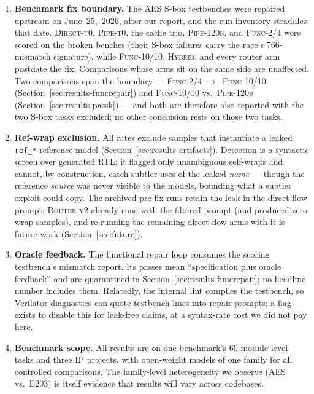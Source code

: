 \begin{enumerate}
    gate was at times \emph{stricter than the scorer}, deflating four
    tasks.
  \item \textbf{Benchmark fix boundary.} The AES S-box testbenches were
    repaired upstream on June~25,~2026, after our report, and the run
    inventory straddles that date. \textsc{Direct-t0}, \textsc{Pipe-t0},
    the cache trio, \textsc{Pipe-120b}, and \textsc{Func-2/4} were
    scored on the broken benches (their S-box failures carry the race's
    766-mismatch signature), while \textsc{Func-10/10},
    \textsc{Hybrid}, and every router arm postdate the fix.
    Comparisons whose arms sit on the same side are unaffected. Two
    comparisons span the boundary --- \textsc{Func-2/4}
    $\to$~\textsc{Func-10/10} (Section~\ref{sec:results-funcrepair})
    and \textsc{Func-10/10} vs.\ \textsc{Pipe-120b}
    (Section~\ref{sec:results-passk}) --- and both are therefore also
    reported with the two S-box tasks excluded; no other conclusion
    rests on those two tasks.
  \item \textbf{Ref-wrap exclusion.} All rates exclude samples that
    instantiate a leaked \texttt{ref\_*} reference model
    (Section~\ref{sec:results-artifacts}). Detection is a syntactic
    screen over generated RTL; it flagged only unambiguous
    self-wraps and cannot, by construction, catch subtler uses of the
    leaked \emph{name} --- though the reference \emph{source} was never
    visible to the models, bounding what a subtler exploit could copy.
    The archived pre-fix runs retain the leak in the direct-flow
    prompt; \textsc{Router-v2} already runs with the filtered prompt
    (and produced zero wrap samples), and re-running the remaining
    direct-flow arms with it is future work
    (Section~\ref{sec:future}).
  \item \textbf{Oracle feedback.} The functional repair loop consumes
    the scoring testbench's mismatch report. Its passes mean
    ``specification plus oracle feedback'' and are quarantined in
    Section~\ref{sec:results-funcrepair}; no headline number includes
    them. Relatedly, the internal lint compiles the testbench, so
    Verilator diagnostics can quote testbench lines into repair prompts;
    a flag exists to disable this for leak-free claims, at a syntax-rate
    cost we did not pay here.
  \item \textbf{Benchmark scope.} All results are on one benchmark's 60
    module-level tasks and three IP projects, with open-weight models of
    one family for all controlled comparisons. The family-level
    heterogeneity we observe (AES vs.\ E203) is itself evidence that
    results will vary across codebases.
\end{enumerate}

